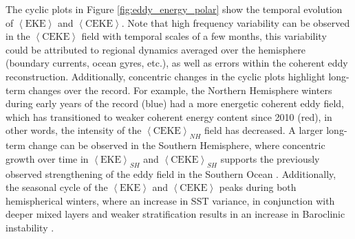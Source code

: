 \documentclass[draft,linenumbers]{agujournal2019}
\newcommand{\EKE}{\textrm{EKE}}
\newcommand{\CEKE}{\textrm{CEKE}}
\begin{document}
	The cyclic plots in Figure \ref{fig:eddy_energy_polar} show the temporal evolution of $\left<\EKE\right>$ and $\left<\CEKE\right>$. 
	Note that high frequency variability can be observed in the $\left<\CEKE\right>$ field with temporal scales of a few months, this variability could be attributed to regional dynamics averaged over the hemisphere (boundary currents, ocean gyres, etc.), as well as errors within the coherent eddy reconstruction. 
	Additionally, concentric changes in the cyclic plots highlight long-term changes over the record. For example, the Northern Hemisphere winters during early years of the record (blue) had a more energetic coherent eddy field, which has transitioned to weaker coherent energy content since 2010 (red), in other words, the intensity of the $\left<\CEKE\right>_{NH}$ field has decreased. A larger long-term change can be observed in the Southern Hemisphere, where concentric growth over time in $\left<\EKE\right>_{SH}$ and $\left<\CEKE\right>_{SH}$ supports the previously observed strengthening of the eddy field in the Southern Ocean \citep{Hogg_Recent_2015,Martinez_TKE_2019,Martinez_Kinetic_2021}. Additionally, the seasonal cycle of the $\left<\EKE\right>$ and $\left<\CEKE\right>$ peaks during both hemispherical winters, where an increase in SST variance, in conjunction with deeper mixed layers and weaker stratification results in an increase in Baroclinic instability \citep{Callies_season_2015,Uchida_Seasonality_2017}.
\end{document}
